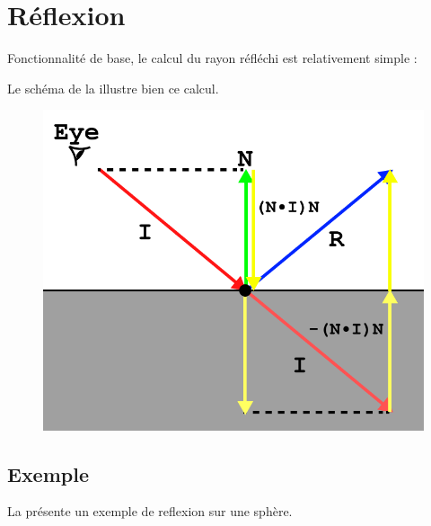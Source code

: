 \section{Réflexion}
Fonctionnalité de base, le calcul du rayon réfléchi est relativement simple :
\begin{center}
\end{center}

Le schéma de la  illustre bien ce calcul. 
\begin{figure}[h]
  \begin{center}
    \includegraphics[width=.7\textwidth,
    keepaspectratio=true]{img/reflectionSchema}
    \label{fig:reflectionSchema}
  \end{center}
\end{figure}

\subsection{Exemple}
La  présente un exemple de reflexion sur une
sphère.

